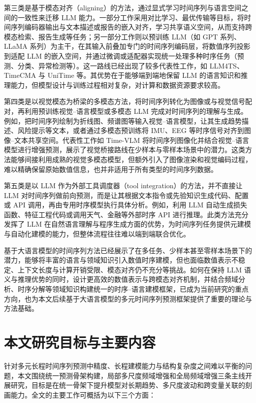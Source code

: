 第三类是基于模态对齐（aligning）的方法，通过显式学习时间序列与语言空间之间的一致性来迁移 LLM 能力。一部分工作采用对比学习、最优传输等目标，将时间序列编码器输出与文本描述或报告的嵌入对齐，学习共享语义空间，从而支持跨模态检索、报告生成等任务；另一部分工作则以预训练 LLM（如 GPT 系列、LLaMA 系列）为主干，在其输入前叠加专门的时间序列编码层，将数值序列投影到适配 LLM 的嵌入空间，并通过微调或适配器实现统一处理多种时序任务（预测、分类、异常检测等）。这一路线已经出现了较多代表性工作，如 LLM4TS、TimeCMA 与 UniTime 等\cite{chang2025llm4ts,liu2025timecma,liu2024unitime}。其优势在于能够端到端地保留 LLM 的语言知识和推理能力，但模型设计与训练过程相对复杂，对计算和数据资源要求较高。

第四类是以视觉模态为桥梁的多模态方法，将时间序列转化为图像或与视觉信号配对，再利用预训练视觉--语言模型或多模态 LLM 完成对时间序列的理解与生成。例如，把时间序列绘制为折线图、频谱图等输入视觉--语言模型，让其生成趋势描述、风险提示等文本，或者通过多模态预训练将 IMU、EEG 等时序信号对齐到图像--文本共享空间。代表性工作如 Time-VLM 将时间序列图像化并结合视觉--语言模型进行增强预测，展示了视觉桥接路线在少样本与零样本场景中的潜力\cite{zhong2025timevlm}。这类方法能够间接利用成熟的视觉多模态模型，但额外引入了图像渲染和视觉编码过程，难以精确保留原始数值信息，也并非适用于所有类型的时间序列数据。

第五类是以 LLM 作为外部工具调度器（tool integration）的方法，并不直接让 LLM 对时间序列做前向预测，而是让其根据文本指令或先验知识生成代码、配置或 API 调用，再由专用时序模型执行具体分析。例如，利用 LLM 自动生成损失函数、特征工程代码或调用天气、金融等外部时序 API 进行推理。此类方法充分发挥了 LLM 在自然语言理解与程序生成方面的优势，为时间序列任务提供元建模与自动化建模的能力，但整体流程往往难以端到端联合优化。

基于大语言模型的时间序列方法已经展示了在多任务、少样本甚至零样本场景下的潜力，能够将丰富的语言与领域知识引入数值时序建模，但也面临数值表示不稳定、上下文长度与计算开销受限、模态对齐仍不充分等挑战。如何在保持 LLM 语义与推理优势的同时，设计更高效的数值表示与跨模态对齐机制，并结合频域分析、时序分解等领域知识构建统一的时序--语言建模框架，已成为当前研究的重点方向，也为本文后续基于大语言模型的多元时间序列预测框架提供了重要的理论与方法基础。
\section{本文研究目标与主要内容}

针对多元长程时间序列预测中精度、长程建模能力与结构复杂度之间难以平衡的问题，本文围绕统一预测骨架构建，局部多尺度频域增强和全局频域增强三条主线开展研究，目标是在统一骨架下提升模型对长期趋势、多尺度波动和跨变量关联的刻画能力。全文的主要工作可概括为以下三个方面：

